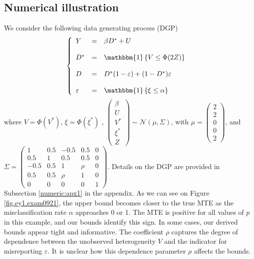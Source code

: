 \documentclass[11pt,reqno]{amsart}
\theoremstyle{plain}
\numberwithin{equation}{section}
\begin{document}
\subsection*{Numerical illustration} \label{numeric1}
We consider the following data generating process (DGP)
\begin{eqnarray}\label{eq:ex}
\left\{ \begin{array}{lcl}
     Y &=& \beta D^*+U \\ \\
     D^* &=& \mathbbm{1}\left\{V \leq \Phi(2 Z)\right\} \\ \\
     D &=& D^*(1-\varepsilon)+(1-D^*)\varepsilon \\ \\
     \varepsilon &=& \mathbbm{1}\left\{\xi \leq \alpha \right\} 
     \end{array} \right.
\end{eqnarray}
where $V=\Phi(V^*)$, $\xi=\Phi(\xi^*)$ , $\begin{pmatrix}
\beta \\ U\\V^*\\ \xi^* \\Z 
\end{pmatrix} \sim \mathcal N(\mu,\Sigma)$, with
$\mu=\begin{pmatrix}
2\\2\\0\\ 0 \\ 2
\end{pmatrix}$, and 
$\Sigma=
\begin{pmatrix}
1 & 0.5&-0.5&0.5& 0  \\ 
 0.5 & 1 & 0.5&0.5& 0\\
 -0.5 & 0.5 & 1&\rho & 0\\
 0.5 & 0.5 & \rho & 1& 0\\
 0 & 0 & 0 & 0 & 1
\end{pmatrix}$.
Details on the DGP are provided in Subsection \ref{numeric:apx1} in the appendix.
As we can see on Figure \ref{fig.ey1.exam0921}, the upper bound becomes closer to the true MTE as the misclassification rate $\alpha$ approaches 0 or 1. The MTE is positive for all values of $p$ in this example, and our bounds identify this sign. In some cases, our derived bounds appear tight and informative. The coefficient $\rho$ captures the degree of dependence between the unobserved heterogeneity $V$ and the indicator for misreporting $\varepsilon$. It is unclear how this dependence parameter $\rho$ affects the bounds.  
\end{document}
